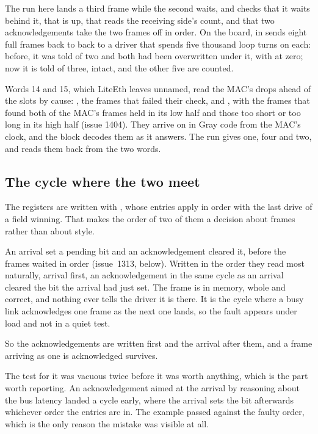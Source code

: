 The run here lands a third frame while the second waits, and checks
that it waits behind it, that  is up, that
 reads the receiving side's count, and that two
acknowledgements take the two frames off in order. On the board,
 in
 sends eight full frames back to back to a driver
that spends five thousand loop turns on each: before, it was told of
two and both had been overwritten under it, with 
at zero; now it is told of three, intact, and the other five are
counted.

Words 14 and 15, which LiteEth leaves unnamed, read the MAC's drops
ahead of the slots by cause: , the frames that
failed their check, and , with the frames that
found both of the MAC's frames held in its low half and those too short
or too long in its high half (issue 1404).
They arrive on  in Gray code from the MAC's clock, and
the block decodes them as it answers. The run gives  one,
four and two, and reads them back from the two words.

\subsection{The cycle where the two meet}

The registers are written with , whose entries apply in
order with the last drive of a field winning. That makes the order of
two of them a decision about frames rather than about style.

An arrival set a pending bit and an acknowledgement cleared it, before
the frames waited in order (issue~1313, below). Written in the order
they read most naturally, arrival first, an acknowledgement in the
same cycle as an arrival cleared the bit the arrival had just set. The frame is in memory, whole and correct, and
nothing ever tells the driver it is there. It is the cycle where a
busy link acknowledges one frame as the next one lands, so the fault
appears under load and not in a quiet test.

So the acknowledgements are written first and the arrival after them,
and a frame arriving as one is acknowledged survives.

The test for it was vacuous twice before it was worth anything, which
is the part worth reporting. An acknowledgement aimed at the arrival
by reasoning about the bus latency landed a cycle early, where the
arrival sets the bit afterwards whichever order the entries are in.
The example passed against the faulty order, which is the only reason
the mistake was visible at all.

